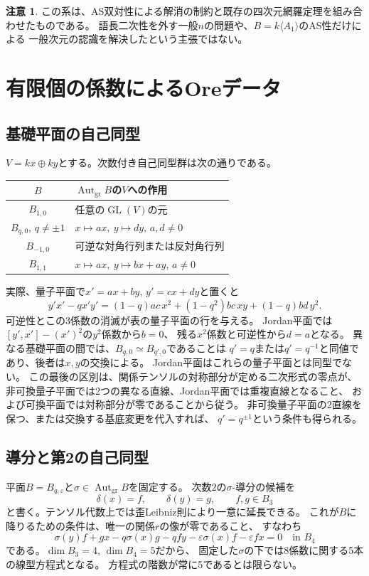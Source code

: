 \documentclass[11pt,a4paper]{ltjsarticle}
\theoremstyle{definition}
\newcommand{\Aut}{\operatorname{Aut}}
\newcommand{\GL}{\operatorname{GL}}
\newtheorem{remark}[theorem]{注意}
\begin{document}
\begin{remark}
この系は、AS双対性による解消の制約と既存の四次元網羅定理を組み合わせたものである。
語長二次性を外す一般$n$の問題や、$B=k\langle A_1\rangle$のAS性だけによる
一般次元の認識を解決したという主張ではない。
\end{remark}

\section{有限個の係数によるOreデータ}\label{spec:sec:data}
\subsection{基礎平面の自己同型}
$V=kx\oplus ky$とする。次数付き自己同型群は次の通りである。
\begin{center}
\begin{tabular}{c|p{.65\linewidth}}
\toprule
$B$ & $\Aut_{\mathrm{gr}}B$の$V$への作用\\
\midrule
$B_{1,0}$ & 任意の$\GL(V)$の元\\
$B_{q,0}$, $q\ne\pm1$ & $x\mapsto ax,\ y\mapsto dy$, $a,d\ne0$\\
$B_{-1,0}$ & 可逆な対角行列または反対角行列\\
$B_{1,1}$ & $x\mapsto ax,\ y\mapsto bx+ay$, $a\ne0$\\
\bottomrule
\end{tabular}
\end{center}
実際、量子平面で$x'=ax+by$, $y'=cx+dy$と置くと
\[
y'x'-qx'y'=(1-q)ac\,x^2+(1-q^2)bc\,xy+(1-q)bd\,y^2.
\]
可逆性とこの3係数の消滅が表の量子平面の行を与える。
Jordan平面では$[y',x']-(x')^2$の$y^2$係数から$b=0$、
残る$x^2$係数と可逆性から$d=a$となる。
異なる基礎平面の間では、$B_{q,0}\simeq B_{q',0}$であることは
$q'=q$または$q'=q^{-1}$と同値であり、後者は$x,y$の交換による。
Jordan平面はこれらの量子平面とは同型でない。
この最後の区別は、関係テンソルの対称部分が定める二次形式の零点が、
非可換量子平面では2つの異なる直線、Jordan平面では重複直線となること、
および可換平面では対称部分が零であることから従う。
非可換量子平面の2直線を保つ、または交換する基底変更を代入すれば、
$q'=q^{\pm1}$という条件も得られる。

\subsection{導分と第2の自己同型}
平面$B=B_{q,\varepsilon}$と$\sigma\in\Aut_{\mathrm{gr}}B$を固定する。
次数2の$\sigma$-導分の候補を
\[
\delta(x)=f,\qquad \delta(y)=g,\qquad f,g\in B_3
\]
と書く。テンソル代数上では歪Leibniz則により一意に延長できる。
これが$B$に降りるための条件は、唯一の関係$r$の像が零であること、
すなわち
\begin{equation}\label{spec:eq:delta-condition}
\sigma(y)f+gx-q\sigma(x)g-qfy
-\varepsilon\sigma(x)f-\varepsilon fx=0\quad\text{in }B_4
\end{equation}
である。$\dim B_3=4$, $\dim B_4=5$だから、
固定した$\sigma$の下では8係数に関する5本の線型方程式となる。
方程式の階数が常に5であるとは限らない。
\end{document}

